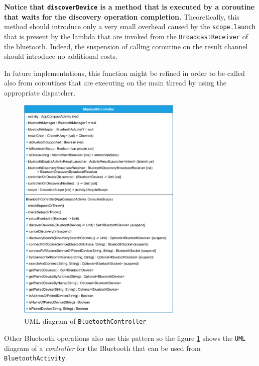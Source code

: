 \textbf{Notice that \texttt{discoverDevice} is a method that is executed by a coroutine that waits for the discovery operation completion.} Theoretically, this method should introduce only a very small overhead caused by the \texttt{scope.launch} that is present by the lambda that are invoked from the \texttt{BroadcastReceiver} of the bluetooth. Indeed, the suspension of calling coroutine on the result channel should introduce no additional costs.

In future implementations, this function might be refined in order to be called also from coroutines that are executing on the main thread by using the appropriate dispatcher.

\begin{figure}[h!]
	\centering
	\includegraphics[width=0.7\textwidth]{img/bluetoothcontroller_uml.pdf}
	\caption{UML diagram of \texttt{BluetoothController}}
	\label{fig:bluetoothcontroller_uml}
\end{figure}

Other Bluetooth operations also use this pattern so the figure \ref{fig:bluetoothcontroller_uml} shows the \texttt{UML} diagram of a \textit{controller} for the Bluetooth that can be used from \texttt{BluetoothActivity}.

